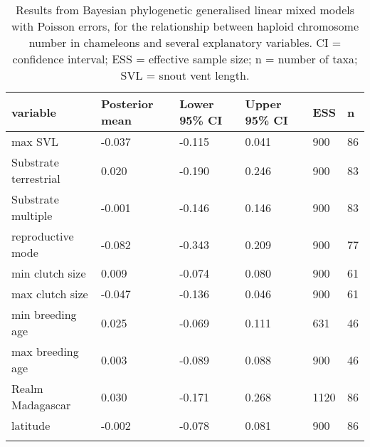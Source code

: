 \begin{longtable}{llllll}

\caption{Results from Bayesian phylogenetic generalised linear mixed models with Poisson errors, for the relationship between haploid chromosome number in chameleons and several explanatory variables. CI = confidence interval; ESS = effective sample size; n = number of taxa; SVL = snout vent length.}\\ 
  
\hline
\textbf{variable} & \textbf{Posterior mean} & \textbf{Lower 95\% CI} & \textbf{Upper 95\% CI} & \textbf{ESS}& \textbf{n} \\
\hline
max SVL &
-0.037 &
-0.115 &
0.041 &
900 &
86 \\
Substrate terrestrial &
0.020 &
-0.190 &
0.246 &
900 &
83\\
Substrate multiple &
-0.001 &
-0.146 &
0.146 &
900 &
83\\
reproductive mode &
-0.082 &
-0.343 &
0.209 &
900 &
77\\
min clutch size &
0.009 &
-0.074 &
0.080 &
900 &
61\\
max clutch size &
-0.047 &
-0.136 &
0.046 &
900 &
61\\
min breeding age &
0.025 &
-0.069 &
0.111 &
631 &
46\\
max breeding age &
0.003 &
-0.089 &
0.088 &
900 &
46\\
Realm Madagascar &
0.030 &
-0.171 &
0.268 &
1120 &
86\\
latitude &
-0.002 &
-0.078 &
0.081 &
900 &
86\\

\hline

\label{table-ecology}
\end{longtable}
